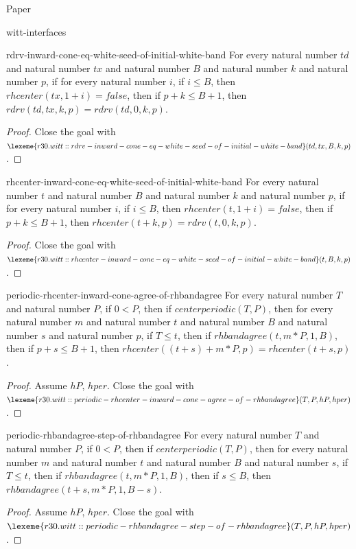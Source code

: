 \begin{lexlean}{Paper}
\begin{section}{witt-interfaces}
  \begin{theorem}{rdrv-inward-cone-eq-white-seed-of-initial-white-band}
  For every natural number \(td\) and natural number \(tx\) and natural number \(B\) and natural number \(k\) and natural number \(p\), if for every natural number \(i\), if \(i ≤ B\), then \(rhcenter(tx, 1 + i) = false\), then if \(p + k ≤ B + 1\), then \(rdrv(td, tx, k, p) = rdrv(td, 0, k, p)\).
  \begin{proof}
  Close the goal with \(\lexeme{r30.witt::rdrv-inward-cone-eq-white-seed-of-initial-white-band}(td, tx, B, k, p)\).
  \end{proof}
  \end{theorem}

  \begin{theorem}{rhcenter-inward-cone-eq-white-seed-of-initial-white-band}
  For every natural number \(t\) and natural number \(B\) and natural number \(k\) and natural number \(p\), if for every natural number \(i\), if \(i ≤ B\), then \(rhcenter(t, 1 + i) = false\), then if \(p + k ≤ B + 1\), then \(rhcenter(t + k, p) = rdrv(t, 0, k, p)\).
  \begin{proof}
  Close the goal with \(\lexeme{r30.witt::rhcenter-inward-cone-eq-white-seed-of-initial-white-band}(t, B, k, p)\).
  \end{proof}
  \end{theorem}

  \begin{theorem}{periodic-rhcenter-inward-cone-agree-of-rhbandagree}
  For every natural number \(T\) and natural number \(P\), if \(0 < P\), then if \(centerperiodic(T, P)\), then for every natural number \(m\) and natural number \(t\) and natural number \(B\) and natural number \(s\) and natural number \(p\), if \(T ≤ t\), then if \(rhbandagree(t, m * P, 1, B)\), then if \(p + s ≤ B + 1\), then \(rhcenter((t + s) + m * P, p) = rhcenter(t + s, p)\).
  \begin{proof}
  Assume \(hP\), \(hper\).
  Close the goal with \(\lexeme{r30.witt::periodic-rhcenter-inward-cone-agree-of-rhbandagree}(T, P, hP, hper)\).
  \end{proof}
  \end{theorem}

  \begin{theorem}{periodic-rhbandagree-step-of-rhbandagree}
  For every natural number \(T\) and natural number \(P\), if \(0 < P\), then if \(centerperiodic(T, P)\), then for every natural number \(m\) and natural number \(t\) and natural number \(B\) and natural number \(s\), if \(T ≤ t\), then if \(rhbandagree(t, m * P, 1, B)\), then if \(s ≤ B\), then \(rhbandagree(t + s, m * P, 1, B - s)\).
  \begin{proof}
  Assume \(hP\), \(hper\).
  Close the goal with \(\lexeme{r30.witt::periodic-rhbandagree-step-of-rhbandagree}(T, P, hP, hper)\).
  \end{proof}
  \end{theorem}


\end{section}
\end{lexlean}
